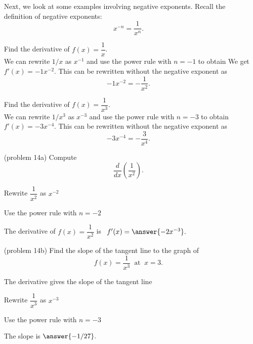 \documentclass[handout]{ximera}
\begin{document}
Next, we look at some examples involving negative exponents. Recall the definition of negative exponents:
\[
x^{-n} = \frac{1}{x^n}.
\]



\begin{example}[example 13]
Find the derivative of $f(x) = \dfrac{1}{x}$.\\
We can rewrite $1/x$ as $x^{-1}$ and use the power rule with $n = -1$ to obtain 
We get $f'(x) = -1x^{-2}$.
This can be rewritten without the negative exponent as
\[ 
-1x^{-2} = -\frac{1}{x^2}.
\]
\end{example}



\begin{example}[example 14]
Find the derivative of $f(x) = \dfrac{1}{x^3}$.\\
We can rewrite $1/x^3$ as $x^{-3}$ and use the power rule with $n = -3$ to obtain 
$f'(x) = -3x^{-4}$.
This can be rewritten without the negative exponent as
\[
-3x^{-4} = -\frac{3}{x^4}.
\]
\end{example}




\begin{problem}(problem 14a)
Compute
\[
\frac{d}{dx} \left(\frac{1}{x^2}\right).
\]
\begin{hint}
Rewrite $\dfrac{1}{x^2}$ as $x^{-2}$
\end{hint}
\begin{hint}
Use the power rule with $n = -2$
\end{hint}
The derivative of $f(x) = \dfrac{1}{x^2}$ is \ $f'(x) = \answer{-2x^{-3}}.$
\end{problem}




\begin{problem}(problem 14b)
Find the slope of the tangent line to the graph of 
\[
f(x) = \frac{1}{x^3} \;\; \text{at} \;\; x = 3.
\]


\begin{hint}
The derivative gives the slope of the tangent line
\end{hint}
\begin{hint}
Rewrite $\dfrac{1}{x^3}$ as $x^{-3}$
\end{hint}
\begin{hint}
Use the power rule with $n = -3$
\end{hint}
The slope is  $\answer{-1/27}.$
\end{problem}
\end{document}
